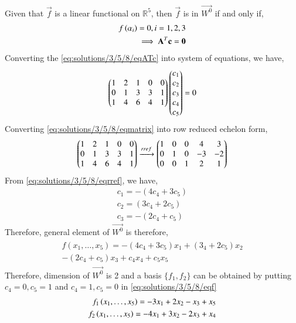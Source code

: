 Given that $\vec{f}$ is a linear functional on $\mathbb{R}^5$, then $\vec{f}$ is in $\vec{W^0}$ if and only if,
\begin{align}
    f\left(\alpha_i\right)=0, i=1,2,3\\
    \implies \mathbf{A}^T\mathbf{c}=\mathbf{0}\label{eq:solutions/3/5/8/eqATc}
\end{align}
Converting the \eqref{eq:solutions/3/5/8/eqATc} into system of equations, we have,
\begin{align}
    \begin{pmatrix}1&2&1&0&0\\0&1&3&3&1\\1&4&6&4&1\end{pmatrix}\begin{pmatrix}c_1\\c_2\\c_3\\c_4\\c_5\end{pmatrix}=0\label{eq:solutions/3/5/8/eqmatrix}
\end{align}
Converting \eqref{eq:solutions/3/5/8/eqmatrix} into row reduced echelon form,
\begin{align}
     \begin{pmatrix}1&2&1&0&0\\0&1&3&3&1\\1&4&6&4&1\end{pmatrix}\xrightarrow[]{rref}\begin{pmatrix}1&0&0&4&3\\0&1&0&-3&-2\\0&0&1&2&1\end{pmatrix}\label{eq:solutions/3/5/8/eqrref}
\end{align}
From \eqref{eq:solutions/3/5/8/eqrref}, we have,
\begin{align}
    c_1=-(4c_4+3c_5)\\
    c_2=(3c_4+2c_5)\\
    c_3=-(2c_4+c_5)
\end{align}
Therefore, general element of $\vec{W^0}$ is therefore,
\begin{multline}
\begin{aligned}
f(x_1,\dots,x_5)=-(4c_4+3c_5)x_1+(3_4+2c_5)x_2\\
-(2c_4+c_5)x_3+c_4x_4+c_5x_5 \label{eq:solutions/3/5/8/eqf}
\end{aligned}
\end{multline}
Therefore, dimension of $\vec{W^0}$ is 2 and a basis $\{f_1,f_2\}$ can be obtained by putting $c_4=0,c_5=1$ and $c_4=1,c_5=0$ in \eqref{eq:solutions/3/5/8/eqf}
\begin{align}
    f_1\left(x_1,\dots,x_5\right)=-3x_1+2x_2-x_3+x_5\\
    f_2\left(x_1,\dots,x_5\right)=-4x_1+3x_2-2x_3+x_4
\end{align}



